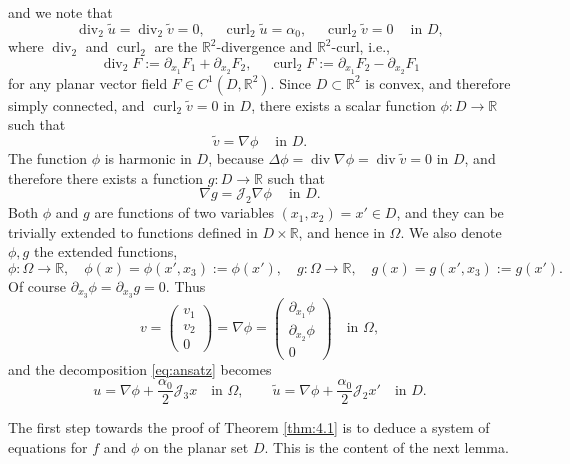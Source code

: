 \documentclass[10pt,reqno,a4paper]{article}
\numberwithin{equation}{section}
\theoremstyle{plain}
\theoremstyle{definition}
\newcommand{\R}{{\mathbb R}}
\newcommand{\mJ}{\mathcal{J}}
\renewcommand{\a}{\alpha}
\newcommand{\pa}{\partial}
\renewcommand{\div}{\operatorname{div}} %
\newcommand{\grad}{\nabla}
\newcommand{\curl}{\operatorname{curl}}
\begin{document}
and we note that 
\[
\div_2 \tilde u = \div_2 \tilde v = 0, \quad \ 
\curl_2 \tilde u = \alpha_0, \quad \ 
\curl_2 \tilde v = 0 \quad \ 
\text{in } D,
\]
where $\div_2$ and $\curl_2$ are the $\R^2$-divergence and $\R^2$-curl, 
i.e.,
\[
\div_2 F := \pa_{x_1} F_1 + \pa_{x_2} F_2, \quad \  
\curl_2 F := \pa_{x_1} F_2 - \pa_{x_2} F_1  
\]
for any planar vector field $F \in C^1(D, \R^2)$. 
Since $D \subset \R^2$ is convex, and therefore simply connected,  
and $\curl_2 \tilde v = 0$ in $D$, 
there exists a scalar function $\phi: D \to \R$ such that 
\begin{equation} \label{def.phi}
\tilde v = \grad \phi 
\quad \ \text{in } D.
\end{equation}
The function $\phi$ is harmonic in $D$, 
because $\Delta \phi = \div \grad \phi = \div \tilde v = 0$ in $D$,  
and therefore there exists a function $g : D \to \R$ such that 
\begin{equation}\label{eq:stream}
\nabla g = \mJ_2 \nabla \phi \quad \ \text{in } D. 
\end{equation}
Both $\phi$ and $g$ are functions of two variables $(x_1, x_2) = x' \in D$, 
and they can be trivially extended to functions defined in $D \times \R$, 
and hence in $\Omega$. 
We also denote $\phi, g$ the extended functions, 
\[
\phi : \Omega \to \R, \quad 
\phi(x) = \phi(x', x_3) := \phi(x'), \quad 
g : \Omega \to \R, \quad  
g(x) = g(x', x_3) := g(x'). 
\]
Of course $\pa_{x_3} \phi = \pa_{x_3} g = 0$. 
Thus 
\[
v 
= \begin{pmatrix} v_1 \\ v_2 \\ 0 \end{pmatrix} 
= \grad \phi 
= \begin{pmatrix} \pa_{x_1} \phi \\ \pa_{x_2} \phi \\ 0 \end{pmatrix} 
\quad \text{in } \Omega, 
\]
and the decomposition \eqref{eq:ansatz} becomes
\begin{equation}\label{u.decomposition}
u = \grad \phi + \frac{\a_0}{2} \mJ_3 x 
\quad \text{in } \Omega,
\qquad  
\tilde u = \grad \phi + \frac{\alpha_0}{2} \mJ_2 x' 
\quad \text{in } D.
\end{equation}

The first step towards the proof of Theorem \ref{thm:4.1} 
is to deduce a system of equations for $f$ and $\phi$ on the planar set $D$. 
This is the content of the next lemma.
\end{document}

